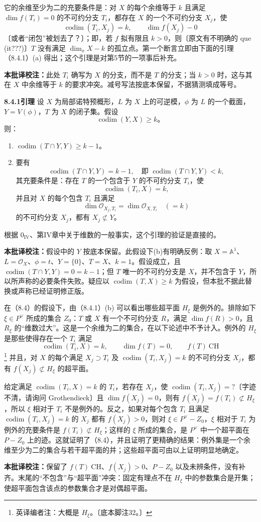\documentclass{ctexbook}
\newcommand{\codim}{\operatorname{codim}}
\newcommand{\ednote}[1]{\footnote{英译编者注：#1}}
\newcommand{\tnote}[1]{\par\smallskip\noindent\textbf{本批译校注：}#1\par\smallskip}
\newcommand{\entry}[2]{\par\bigskip\noindent\textbf{#1\quad #2}\quad}
\begin{document}
它的余维至少为二的充要条件是：对 $X$ 的每个余维等于 $k$ 且满足 $\dim f(T_i)=0$ 的不可约分支 $T_i$，都存在 $X$ 的一个不可约分支 $X_j$，使
\[
\codim(T_i,X_j)=k,\qquad \dim f(X_j)-0
\]
〔或者“闭包”被划去了？〕；即，若 $f$ 拟有限且 $k>0$，则〔原文有不明确的 que (it???)〕$T$ 没有满足 $\dim_xX-k$ 的孤立点。第一个断言立即由下面的引理（8.4.1）(a) 得出；这个引理是对第5节的一项事后补充。
\tnote{此处 $T_i$ 确写为 $X$ 的分支，而不是 $T$ 的分支；当 $k>0$ 时，这与其在 $X$ 中余维等于 $k$ 的要求冲突。减号写法按底本保留，不据猜测填成等号。}

\entry{8.4.1}{引理}
设 $X$ 为局部诺特预概形，$L$ 为 $X$ 上的可逆模，$\phi$ 为 $L$ 的一个截面，$Y=V(\phi)$，$T$ 为 $X$ 的闭子集。假设
\[
\codim(Y,X)\geq k\text{。}
\]
则：
\begin{enumerate}
\item[(a)] $\codim(T\cap Y,Y)\geq k-1$。
\item[(b)] 要有
\[
\codim(T\cap Y,Y)=k-1,
\quad\text{即 }\codim(T\cap Y,Y)<k,
\]
其充要条件是：存在 $T$ 的一个包含于 $Y$ 的不可约分支 $T_i$，使
\[\codim(T_i,X)=k,\]
并且对 $X$ 的每个包含 $T_i$ 且满足
\[
\dim\mathcal O_{X_j,T_i}=\dim\mathcal O_{X,T_i}\quad(=k)
\]
的不可约分支 $X_j$，都有 $X_j\not\subset Y$。
\end{enumerate}
根据 $0_{\mathrm{IV}}$、第IV章中关于维数的一般事实，这个引理的验证是直接的。
\tnote{假设中的 $Y$ 按底本保留。此假设下(b)有明确反例：取 $X=\mathbb A^1$、$L=\mathcal O_X$、$\phi=t$、$Y=\{0\}$、$T=X$、$k=1$。假设成立，且 $\codim(T\cap Y,Y)=0=k-1$；但 $T$ 唯一的不可约分支是 $X$，并不包含于 $Y$，所以所声称的必要条件失败。疑应以 $\codim(T,X)\geq k$ 为假设，但本批不据此替换或声称已经证明修正版。}

在（8.4）的假设下，由（8.4.1）(b) 可以看出哪些超平面 $H_\xi$ 是例外的。排除如下 $\xi\in P^\vee$ 所成的集合 $Z_0$：$T$ 或 $X$ 有一个不可约分支 $R$，满足 $\dim f(R)>0$，且 $R_\xi$ 的“维数过大”。这是一个余维为二的集合，在以下论述中不予计入。例外的 $H_\xi$ 是那些使得存在一个 $T_i$ 满足
\[
\codim(T_i,X)=k,\qquad\dim f(T)=0,\qquad f(T)\ \mathrm{CH}
\]
\ednote{大概是 $H_\xi$。〔底本脚注32。〕}
并且，对 $X$ 的每个满足 $X_j\supset T_i$ 及 $\codim(T_i,X_j)=k$ 的不可约分支 $X_j$，都有 $f(X_j)\not\subset H_\xi$ 的超平面。

给定满足 $\codim(T_i,X)=k$ 的 $T_i$，若存在 $X_j$，使 $\codim(T_i,X_j)=?$〔字迹不清，请询问 Grothendieck〕且 $\dim f(X_j)=0$，则有 $f(X_j)=f(T_i)\not\subset H_\xi$，所以 $\xi$ 相对于 $T_i$ 不是例外的。反之，如果对每个包含 $T_i$ 且满足 $\codim(T_i,X_j)=k$ 的 $X_j$ 都有 $f(X_j)>0$，则对 $\xi\in P^\vee-Z_0$，$\xi$ 相对于 $T_i$ 为例外的充要条件是 $f(T_i)\not\subset H_\xi$；这样的 $\xi$ 所成的集合，是 $P^\vee$ 中一个超平面在 $P-Z_0$ 上的迹。这就证明了（8.4），并且证明了更精确的结果：例外集是一个余维至少为二的集合与若干超平面的并；这些超平面可由以上证明明显地确定。
\tnote{保留了 $f(T)\ \mathrm{CH}$、$f(X_j)>0$、$P-Z_0$ 以及未辨条件，没有补齐。末尾的“不包含”与“超平面”冲突：固定有理点不在 $H_\xi$ 中的参数集合是开集；使超平面包含该点的参数集合才是对偶超平面。}
\end{document}
